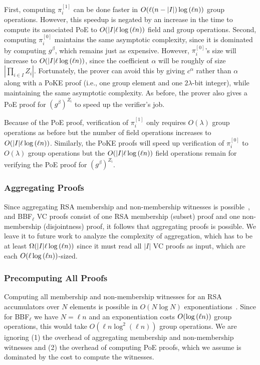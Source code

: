 First, computing $\pi_i^{[1]}$ can be done faster in $O(\ell (n-|I|) \log{(\ell n)})$ group operations.
However, this speedup is negated by an increase in the time to compute its associated PoE to $O(|I|\ell\log{(\ell n)})$ field and group operations.
Second, computing $\pi_i^{[0]}$ maintains the same asymptotic complexity, since it is dominated by computing $g^\beta$, which remains just as expensive.
However, $\pi_i^{[0]}$'s size will increase to $O(|I|\ell\log{(\ell n)})$, since the \bezout coefficient $\alpha$ will be roughly of size $|\prod_{i\in I} Z_i|$.
Fortunately, the prover can avoid this by giving $c^\alpha$ rather than $\alpha$ along with a PoKE proof (i.e., one group element and one $2\lambda$-bit integer), while maintaining the same asymptotic complexity.
As before, the prover also gives a PoE proof for $\left(g^{\beta}\right)^{Z_i}$ to speed up the verifier's job.

Because of the PoE proof, verification of $\pi_i^{[1]}$ only requires $O(\lambda)$ group operations as before but the number of field operations increases to $O(|I|\ell\log{(\ell n)})$.
Similarly, the PoKE proofs will speed up verification of $\pi_i^{[0]}$ to $O(\lambda)$ group operations but the $O(|I|\ell\log{(\ell n)})$ field operations remain for verifying the PoE proof for $\left(g^{\beta}\right)^{Z_i}$.

\subsubsection{Aggregating Proofs}
Since aggregating RSA membership and non-membership witnesses is possible~\cite{BBF18}, and BBF$_\ell$ VC proofs consist of one RSA membership (subset) proof and one non-membership (disjointness) proof, it follows that aggregating proofs is possible.
We leave it to future work to analyze the complexity of aggregation, which has to be at least $\Omega(|I|\ell\log{(\ell n)})$ since it must read all $|I|$ VC proofs as input, which are each $O(\ell\log{(\ell n)})$-sized.

\subsubsection{Precomputing All Proofs}
Computing all membership and non-membership witnesses for an RSA accumulators over $N$ elements is possible in $O(N\log{N})$ exponentiations~\cite{BBF18,SSY01}.
Since for BBF$_\ell$ we have $N=\ell n$ and an exponentiation costs $O(\log{(\ell n)})$ group operations, this would take $O(\ell n \log^2{(\ell n)})$ group operations.
We are ignoring (1) the overhead of aggregating membership and non-membership witnesses and (2) the overhead of computing PoE proofs, which we assume is dominated by the cost to compute the witnesses.

